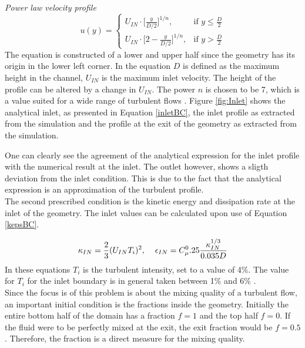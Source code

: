 \documentclass{CFD2017}
\begin{document}
\emph{Power law velocity profile}
\begin{equation}
\label{inletBC}
u(y) = \begin{cases} U_{IN}\cdot \big[\frac{y}{D/2}\big]^{1/n}, & \mbox{if } y\leq\frac{D}{2} \\ U_{IN}\cdot \big[2-\frac{y}{D/2}\big]^{1/n}, & \mbox{if } y>\frac{D}{2}\end{cases}
\end{equation}
The equation is constructed of a lower and upper half since the geometry has its origin in the lower left corner. In the equation $D$ is defined as the maximum height in the channel, $U_{IN}$ is the maximum inlet velocity. The height of the profile can be altered by a change in $U_{IN}$. The power $n$ is chosen to be 7, which is a value suited for a wide range of turbulent flows \cite{Morrison}. Figure \ref{fig:Inlet} shows the analytical inlet, as presented in Equation \ref{inletBC}, the inlet profile as extracted from the simulation and the profile at the exit of the geometry as extracted from the simulation.


One can clearly see the agreement of the analytical expression for the inlet profile with the numerical result at the inlet. The outlet however, shows a sligth deviation from the inlet condition. This is due to the fact that the analytical expression is an approximation of the turbulent profile.\\
The second prescribed condition is the kinetic energy and dissipation rate at the inlet of the geometry. The inlet values can be calculated upon use of Equation \ref{kepsBC}.

\begin{equation}
\label{kepsBC}
\kappa_{IN}=\frac{2}{3}(U_{IN}T_i)^2,\hspace{4mm}\epsilon_{IN}=C_{\mu}^0.25\frac{\kappa_{IN}^{1/3}}{0.035 D}
\end{equation}
In these equations $T_i$ is the turbulent intensity, set to a value of 4\%. The value for $T_i$ for the inlet boundary is in general taken between 1\% and 6\% \cite{Versteeg2007}.\\
Since the focus is of this problem is about the mixing quality of a turbulent flow, an important initial condition is the fractions inside the geometry. Initially the entire bottom half of the domain has a fraction $f=1$ and the top half $f=0$. If the fluid were to be perfectly mixed at the exit, the exit fraction would be $f=0.5$. Therefore, the fraction is a direct measure for the mixing quality.\\
\end{document}

